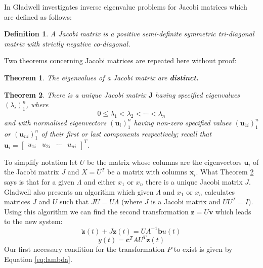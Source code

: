 \documentclass{mbd_fullpaper}
\newtheorem{theorem}{Theorem}
\newtheorem{definition}{Definition}
\begin{document}
In \cite{gladwell1986inverse} Gladwell investigates inverse eigenvalue problems for Jacobi matrices which are defined as follows:
\begin{definition}
A Jacobi matrix is a positive semi-definite symmetric tri-diagonal matrix with strictly negative co-diagonal.
\end{definition}
Two theorems concerning Jacobi matrices are repeated here without proof:
\begin{theorem}
The eigenvalues of a Jacobi matrix are \bf{distinct}.
\label{the:jac1}
\end{theorem}
\begin{theorem}
There is a unique Jacobi matrix $\mathbf{J}$ having specified eigenvalues $(\lambda_i)_1^n$, where
\begin{equation}
0 \leq \lambda_1<\lambda_2< \cdots <\lambda_n
\label{eq:lambda}
\end{equation}
and with normalised eigenvectors $(\mathbf{u}_i)_1^n$  having non-zero specified values $(\mathbf{u}_{1i})_1^n$ or $(\mathbf{u}_{ni})_1^n$ of their first or last components respectively;
recall that $\mathbf{u}_i = \begin{bmatrix} u_{1i} &  u_{2i} & \cdots & u_{ni} \end{bmatrix}^T$.
\label{the:jac2}
\end{theorem}
To simplify notation let $U$ be the matrix whose columns are the eigenvectors $\mathbf{u}_i$ of the Jacobi matrix $J$ and $X = U^T$ be a matrix with columns $\mathbf{x}_i$.
What Theorem \ref{the:jac2} says is that for a given $\Lambda$ and either $x_1$ or $x_n$ there is a unique Jacobi matrix $J$.
Gladwell also presents an algorithm which given $\Lambda$ and $x_1$ or $x_n$ calculates matrices $J$ and $U$ such that $J U = U \Lambda$ (where $J$ is a Jacobi matrix and $U U^T = I$).
Using this algorithm we can find the second transformation $\mathbf{z} = U \mathbf{v}$ which leads to the new system:
\begin{equation}
\ddot{\mathbf{z}}(t) + J \mathbf{z}(t) =   U A^{-1} \mathbf{b}u(t)
\label{eq:jacobi1}
\end{equation}
\begin{equation}
y(t) = \mathbf{c}^T  A U^T \mathbf{z}(t)
\label{eq:jacobi2}
\end{equation}
Our first necessary condition for the transformation $P$ to exist is given by Equation \ref{eq:lambda}.
\end{document}
